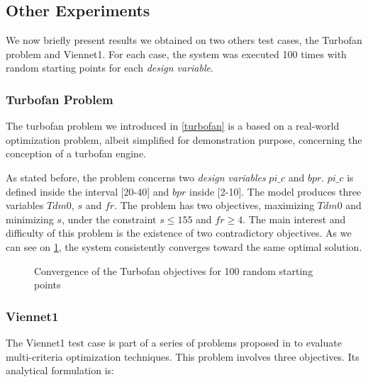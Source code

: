 \subsection{Other Experiments}

We now briefly present results we obtained on two others test cases, the Turbofan problem and Viennet1. For each case, the system was executed 100 times with random starting points for each \emph{design variable}.

\subsubsection{Turbofan Problem}

The turbofan problem we introduced in \figurename \ref{turbofan} is a based on a real-world optimization problem, albeit simplified for demonstration purpose, concerning the conception of a turbofan engine.

As stated before, the problem concerns two \emph{design variables} $pi\_c$ and $bpr$. $pi\_c$ is defined inside the interval [20-40] and $bpr$ inside [2-10]. The model produces three variables $Tdm0$, $s$ and $fr$.
The problem has two objectives, maximizing  $Tdm0$ and minimizing $s$, under the constraint \(s \leq 155\) and \(fr \geq 4\).
The main interest and difficulty of this problem is the existence of two contradictory objectives.
As we can see on \figurename \ref{snecma_res}, the system consistently converges toward the same optimal solution.

\begin{figure}[h]
	\hfill%
	\caption{Convergence of the Turbofan objectives for 100 random starting points}
	\label{snecma_res}
\end{figure}

\subsubsection{Viennet1}

The Viennet1 test case is part of a series of problems proposed in \cite{viennet1996multicriteria} to evaluate multi-criteria optimization techniques. This problem involves three objectives. Its analytical formulation is:


